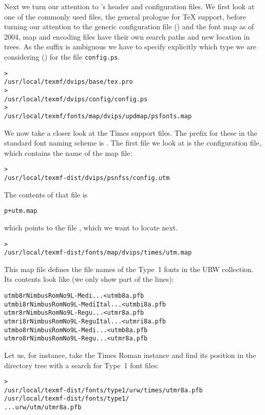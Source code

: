 \documentclass{article}
\begin{document}
Next we turn our attention to 's header and configuration
files.  We first look at one of the commonly used files, the general
prologue  for \TeX{} support, before turning our attention
to the generic configuration file () and the \PS{} font
map \Dash as of 2004, map and encoding files have
their own search paths and new location in  trees.  As
the  suffix is ambiguous we have to specify explicitly which
type we are considering () for the file
\texttt{config.ps}.
\begin{alltt}
> 
   /usr/local/texmf/dvips/base/tex.pro
> 
   /usr/local/texmf/dvips/config/config.ps
> 
   /usr/local/texmf/fonts/map/dvips/updmap/psfonts.map
\end{alltt}

We now take a closer look at the  Times \PS{} support
files.  The prefix for these in the standard font naming scheme is
.  The first file we look at is the configuration file,
which contains the name of the map file:
\begin{alltt}
> 
   /usr/local/texmf-dist/dvips/psnfss/config.utm
\end{alltt}
The contents of that file is
\begin{alltt}
  p +utm.map
\end{alltt}
which points to the file , which we want to
locate next.
\begin{alltt}
> 
   /usr/local/texmf-dist/fonts/map/dvips/times/utm.map
\end{alltt}
This map file defines the file names of the Type~1 \PS{} fonts in
the URW collection.  Its contents look like (we only show part of the
lines):
\begin{alltt}
utmb8r  NimbusRomNo9L-Medi    ... <utmb8a.pfb
utmbi8r NimbusRomNo9L-MediItal... <utmbi8a.pfb
utmr8r  NimbusRomNo9L-Regu    ... <utmr8a.pfb
utmri8r NimbusRomNo9L-ReguItal... <utmri8a.pfb
utmbo8r NimbusRomNo9L-Medi    ... <utmb8a.pfb
utmro8r NimbusRomNo9L-Regu    ... <utmr8a.pfb
\end{alltt}
Let us, for instance, take the Times Roman instance
 and find its position in the  directory
tree with a search for Type~1 font files:
\begin{alltt}
> 
\ifSingleColumn   /usr/local/texmf-dist/fonts/type1/urw/times/utmr8a.pfb
\else   /usr/local/texmf-dist/fonts/type1/
... urw/utm/utmr8a.pfb
\fi\end{alltt}
\end{document}
